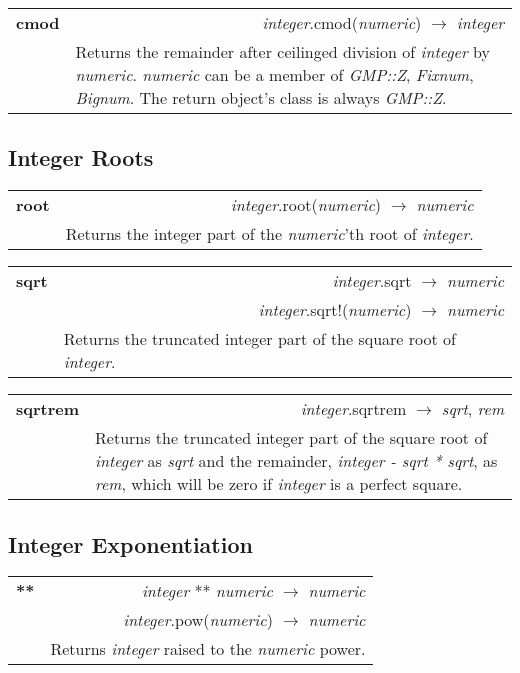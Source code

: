 \documentclass[pdftex,10pt]{article}
\newlength{\methwidth}
\newlength{\defnwidth}
\begin{document}
\begin{tabular}{p{\methwidth} l r}
\toprule
\textbf{cmod} & & \textit{integer}.cmod(\textit{numeric}) $\rightarrow$ \textit{integer}\\
\cmidrule(r){2-3}
& \multicolumn{2}{p{\defnwidth}}{
  Returns the remainder after ceilinged division of \textit{integer} by \textit{numeric}.
  \textit{numeric} can be a member of \textit{GMP::Z}, \textit{Fixnum}, \textit{Bignum}.
  The return object's class is always \textit{GMP::Z}.
}
\end{tabular}

\subsection{Integer Roots}

\begin{tabular}{p{\methwidth} l r}
\toprule
\textbf{root} & & \textit{integer}.root(\textit{numeric}) $\rightarrow$ \textit{numeric} \\
\cmidrule(r){2-3}
& \multicolumn{2}{p{\defnwidth}}{
  Returns the integer part of the \textit{numeric}'th root of \textit{integer}.
}
\end{tabular}
\newline\newline

\begin{tabular}{p{\methwidth} l r}
\toprule
\textbf{sqrt} & & \textit{integer}.sqrt $\rightarrow$ \textit{numeric} \\
& & \textit{integer}.sqrt!(\textit{numeric}) $\rightarrow$ \textit{numeric} \\
\cmidrule(r){2-3}
& \multicolumn{2}{p{\defnwidth}}{
  Returns the truncated integer part of the square root of \textit{integer}.
}
\end{tabular}
\newline\newline

\begin{tabular}{p{\methwidth} l r}
\toprule
\textbf{sqrtrem} & & \textit{integer}.sqrtrem $\rightarrow$ \textit{sqrt}, \textit{rem} \\
\cmidrule(r){2-3}
& \multicolumn{2}{p{\defnwidth}}{
  Returns the truncated integer part of the square root of \textit{integer} as
  \textit{sqrt} and the remainder, \textit{integer - sqrt * sqrt}, as \textit{rem}, which
  will be zero if \textit{integer} is a perfect square.
}
\end{tabular}

\subsection{Integer Exponentiation}

\begin{tabular}{p{\methwidth} l r}
\toprule
\textbf{**} & & \textit{integer} ** \textit{numeric} $\rightarrow$ \textit{numeric} \\
& & \textit{integer}.pow(\textit{numeric}) $\rightarrow$ \textit{numeric} \\
\cmidrule(r){2-3}
& \multicolumn{2}{p{\defnwidth}}{
  Returns \textit{integer} raised to the \textit{numeric} power.
}
\end{tabular}
\end{document}
